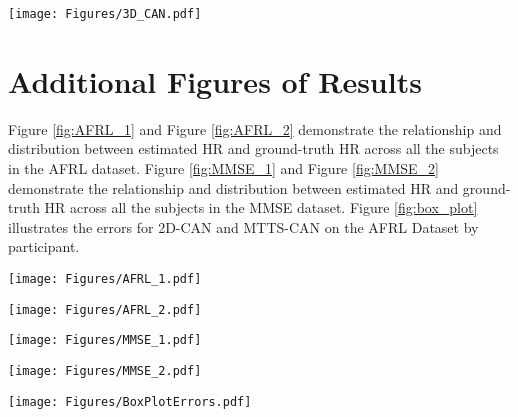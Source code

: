 \documentclass{article}
\begin{document}
\begin{figure*}[p!]
  \texttt{[image: Figures/3D\_CAN.pdf]}
  \caption{Architecture details of 3D-CAN and MT-3DCAN}
  \label{fig:3D-CAN}
\end{figure*}

\section{Additional Figures of Results}

Figure \ref{fig:AFRL_1} and Figure \ref{fig:AFRL_2} demonstrate the relationship and distribution between estimated HR and ground-truth HR across all the subjects in the AFRL dataset. Figure \ref{fig:MMSE_1} and Figure \ref{fig:MMSE_2} demonstrate the relationship and distribution between estimated HR and ground-truth HR across all the subjects in the MMSE dataset. Figure \ref{fig:box_plot} illustrates the errors for 2D-CAN and MTTS-CAN on the AFRL Dataset by participant. 

\begin{figure*}[p!]
  \texttt{[image: Figures/AFRL\_1.pdf]}
  \caption{AFRL Dataset: Estimated HR and Gold-standard HR reference measurements in (beats-per-minute) and the corresponding Bland-Altman plots from 2D-CAN, 3D-CAN and Hybrid-CAN. All results computed for 30-second time windows.}
  \label{fig:AFRL_1}
\end{figure*}

\begin{figure*}[p!]
  \texttt{[image: Figures/AFRL\_2.pdf]}
  \caption{AFRL Dataset: Estimated HR and Gold-standard HR reference measurements in (beats-per-minute) and the corresponding Bland-Altman plots from MT-Hybrid-CAN and MTTS-CAN. All results computed for 30-second time windows.}
  \label{fig:AFRL_2}
\end{figure*}

\begin{figure*}[p!]
  \texttt{[image: Figures/MMSE\_1.pdf]}
  \caption{MMSE-HR Dataset: Estimated HR and Gold-standard HR reference measurements in (beats-per-minute) and the corresponding Bland-Altman plots from 2D-CAN, 3D-CAN and Hybrid-CAN. Note the following files were removed due to unreliable reference measurements: F006-T11, F013-T08, F013-T11, F014-T01, F014-T08, F014-T10, F014-T11, F015-T11, F022-T10, M013-T11}
  \label{fig:MMSE_1}
\end{figure*}

\begin{figure*}[p!]
  \texttt{[image: Figures/MMSE\_2.pdf]}
  \caption{MMSE-HR Dataset: Estimated HR and Gold-standard HR reference measurements in (beats-per-minute) and the corresponding Bland-Altman plots from MT-Hybrid-CAN and MTTS-CAN.}
  \label{fig:MMSE_2}
\end{figure*}

\begin{figure*}[h!]
  \texttt{[image: Figures/BoxPlotErrors.pdf]}
  \caption{Box Plot of Errors for 2D-CAN and MTTS-CAN on the AFRL Dataset by Participant.}
  \label{fig:box_plot}
\end{figure*}


\label{headings}
\end{document}
